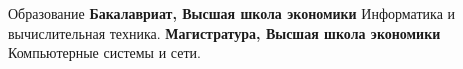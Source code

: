 \begin{rubric}{Образование}
\entry*[2022 -- 2026]%
	\textbf{Бакалавриат, Высшая школа экономики} Информатика и вычислительная техника.
%
\entry*[2026 -- 2028]%
	\textbf{Магистратура, Высшая школа экономики} Компьютерные системы и сети.
%
\end{rubric}